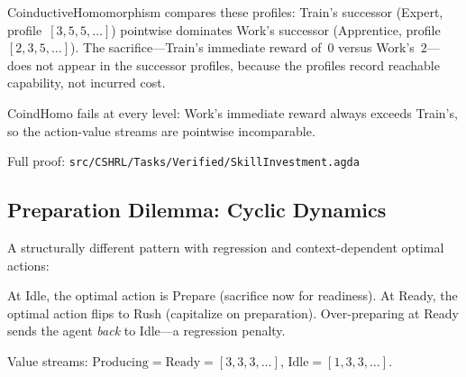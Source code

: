 \documentclass[9pt,a4paper]{article}
\newcommand{\fpath}[1]{\nolinkurl{#1}}
\theoremstyle{plain}
\theoremstyle{definition}
\theoremstyle{remark}
\begin{document}
CoinductiveHomomorphism compares these profiles: Train's successor (Expert, profile~$[3,5,5,\ldots]$) pointwise dominates Work's successor (Apprentice, profile~$[2,3,5,\ldots]$).  The sacrifice---Train's immediate reward of~$0$ versus Work's~$2$---does not appear in the successor profiles, because the profiles record reachable capability, not incurred cost.

CoindHomo fails at every level: Work's immediate reward always exceeds Train's, so the action-value streams are pointwise incomparable.

Full proof: \fpath{src/CSHRL/Tasks/Verified/SkillInvestment.agda}

\subsection{Preparation Dilemma: Cyclic Dynamics}

A structurally different pattern with regression and context-dependent optimal actions:

\begin{center}
\end{center}

\noindent At Idle, the optimal action is Prepare (sacrifice now for readiness).  At Ready, the optimal action flips to Rush (capitalize on preparation).  Over-preparing at Ready sends the agent \emph{back} to Idle---a regression penalty.

Value streams: $\text{Producing} = \text{Ready} = [3,3,3,\ldots]$, $\text{Idle} = [1,3,3,\ldots]$.
\end{document}
